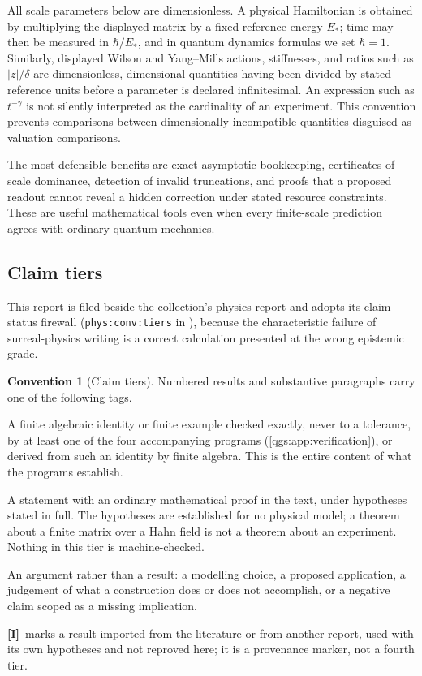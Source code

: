 \documentclass[11pt,oneside]{article}
\numberwithin{equation}{section}
\theoremstyle{plain}
\theoremstyle{definition}
\newtheorem{convention}[convention]{Convention}
\theoremstyle{remark}
\newcommand{\abs}[1]{\left|#1\right|}
\newcommand{\TE}{\textcolor{TierE}{\textsf{\bfseries[E]}}}
\newcommand{\TC}{\textcolor{TierC}{\textsf{\bfseries[C]}}}
\newcommand{\TA}{\textcolor{TierA}{\textsf{\bfseries[A]}}}
\newcommand{\TI}{\textcolor{TierI}{\textsf{\bfseries[I]}}}
\begin{document}
All scale parameters below are dimensionless. A physical Hamiltonian is obtained by multiplying the displayed matrix by a fixed reference energy $E_\ast$; time may then be measured in $\hbar/E_\ast$, and in quantum dynamics formulas we set $\hbar=1$. Similarly, displayed Wilson and Yang--Mills actions, stiffnesses, and ratios such as $\abs z/\delta$ are dimensionless, dimensional quantities having been divided by stated reference units before a parameter is declared infinitesimal. An expression such as $t^{-\gamma}$ is not silently interpreted as the cardinality of an experiment. This convention prevents comparisons between dimensionally incompatible quantities disguised as valuation comparisons.

The most defensible benefits are exact asymptotic bookkeeping, certificates of scale dominance, detection of invalid truncations, and proofs that a proposed readout cannot reveal a hidden correction under stated resource constraints. These are useful mathematical tools even when every finite-scale prediction agrees with ordinary quantum mechanics.

\subsection{Claim tiers}\label{qgs:sec:tiers}
This report is filed beside the collection's physics report and adopts its claim-status firewall (\texttt{phys:conv:tiers} in \cite{repoPhysics}), because the characteristic failure of surreal-physics writing is a correct calculation presented at the wrong epistemic grade.

\begin{convention}[Claim tiers]\label{qgs:conv:tiers}
Numbered results and substantive paragraphs carry one of the following tags.
\begin{description}[style=nextline,leftmargin=0pt,labelsep=0pt]
\item[\TE\ Exact symbolic identity.] A finite algebraic identity or finite example checked exactly, never to a tolerance, by at least one of the four accompanying programs (\cref{qgs:app:verification}), or derived from such an identity by finite algebra. This is the entire content of what the programs establish.
\item[\TC\ Mathematical theorem.] A statement with an ordinary mathematical proof in the text, under hypotheses stated in full. The hypotheses are established for no physical model; a theorem about a finite matrix over a Hahn field is not a theorem about an experiment. Nothing in this tier is machine-checked.
\item[\TA\ Assessment.] An argument rather than a result: a modelling choice, a proposed application, a judgement of what a construction does or does not accomplish, or a negative claim scoped as a missing implication.
\end{description}
\TI\ marks a result imported from the literature or from another report, used with its own hypotheses and not reproved here; it is a provenance marker, not a fourth tier.
\end{convention}
\end{document}
